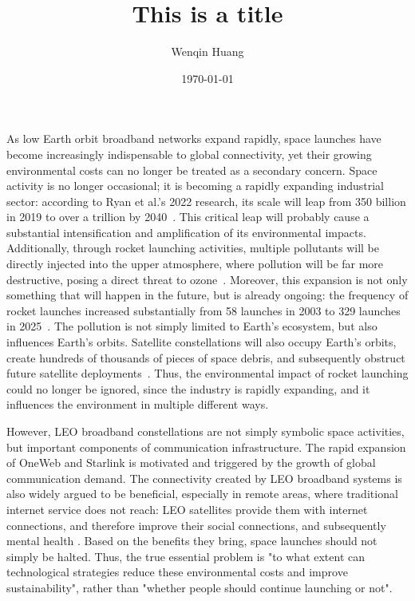 \documentclass[12pt]{article}
\title{This is a title}
\author{Wenqin Huang}
\date{\today}
\begin{document}
\maketitle


As low Earth orbit broadband networks expand rapidly, space launches have become increasingly indispensable to global connectivity, yet their growing environmental costs can no longer be treated as a secondary concern. Space activity is no longer occasional; it is becoming a rapidly expanding industrial sector: according to Ryan et al.'s 2022 research, its scale will leap from 350 billion in 2019 to over a trillion by 2040~\citep{ryan2022ozone,bushnell2018newspace}. This critical leap will probably cause a substantial intensification and amplification of its environmental impacts. Additionally, through rocket launching activities, multiple pollutants will be directly injected into the upper atmosphere, where pollution will be far more destructive, posing a direct threat to ozone~\citep{ryan2022ozone,kokkinakis2022pollution}. Moreover, this expansion is not only something that will happen in the future, but is already ongoing: the frequency of rocket launches increased substantially from 58 launches in 2003 to 329 launches in 2025~\citep{mcdowell2025space}. The pollution is not simply limited to Earth's ecosystem, but also influences Earth's orbits. Satellite constellations will also occupy Earth's orbits, create hundreds of thousands of pieces of space debris, and subsequently obstruct future satellite deployments~\citep{torres2020reusable}. Thus, the environmental impact of rocket launching could no longer be ignored, since the industry is rapidly expanding, and it influences the environment in multiple different ways.



However, LEO broadband constellations are not simply symbolic space activities, but important components of communication infrastructure. The rapid expansion of OneWeb and Starlink is motivated and triggered by the growth of global communication demand. The connectivity created by LEO broadband systems is also widely argued to be beneficial, especially in remote areas, where traditional internet service does not reach: LEO satellites provide them with internet connections, and therefore improve their social connections, and subsequently mental health \citep{osoro2025leo,sandau2010smallsat}. Based on the benefits they bring, space launches should not simply be halted. Thus, the true essential problem is "to what extent can technological strategies reduce these environmental costs and improve sustainability", rather than "whether people should continue launching or not".
\end{document}
